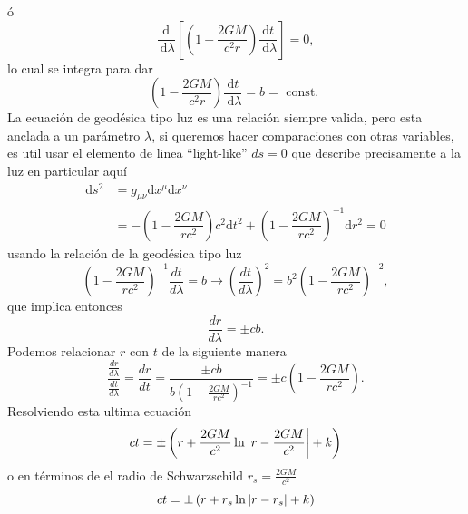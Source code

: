 ó
\begin{equation}
    \frac{\mathrm{d}}{\mathrm{~d} \lambda}\left[\left(1-\dfrac{2 G M}{c^2 r}\right) \frac{\mathrm{d} t}{\mathrm{~d} \lambda}\right]=0,
\end{equation}
lo cual se integra para dar
\begin{equation}
    \left(1-\dfrac{2 G M}{c^2 r}\right) \frac{\mathrm{d} t}{\mathrm{~d} \lambda}=b=\text { const. }
\end{equation}
La ecuación de geodésica tipo luz es una relación siempre valida, pero esta anclada a un parámetro $\lambda$, si queremos hacer comparaciones con otras variables, es util usar el elemento de linea ``light-like'' $ds = 0$ que describe precisamente a la luz  en particular aquí
\begin{equation}
    \begin{aligned}
        \mathrm{d} s^2 & =g_{\mu \nu} \mathrm{d} x^\mu \mathrm{d} x^\nu                                                                      \\
                       & =-\left(1-\dfrac{2 G M}{r c^2}\right)c^2 \mathrm{d} t^2+\left(1-\dfrac{2 G M}{r c^2}\right)^{-1} \mathrm{d} r^2 = 0
    \end{aligned}
\end{equation}
usando la relación de la geodésica tipo luz 
\begin{equation}
    \left(1-\frac{2 G M}{r c^2}\right)^{-1} \frac{dt}{d\lambda}  = b \rightarrow  \left(\frac{dt}{d\lambda}\right)^2 = b^2 \left(1-\frac{2 G M}{r c^2}\right)^{-2},
\end{equation}
que implica  entonces
\begin{equation}
    \frac{d r }{d \lambda}= \pm cb.
\end{equation}
Podemos relacionar $r$ con $t$  de la siguiente manera
\begin{equation}
    \frac{\frac{dr}{d\lambda}}{\frac{dt}{d\lambda}} =   \frac{dr}{dt} =  \frac{\pm cb }{ b \left(1-\frac{2 G M}{r c^2}\right)^{-1}} = \pm c \left(1-\frac{2 G M}{r c^2}\right).
\end{equation}
Resolviendo esta ultima ecuación
\begin{equation}
    ct = \pm \left(r + \frac{2 G M}{c^2} \ln \left| r -\frac{2 G M}{c^2}  \right| + k \right)
\end{equation}
o en términos de el radio de Schwarzschild $r_s = \frac{2 G M}{c^2}$
\begin{equation}
    ct = \pm \left(r + r_s \ln\left| r - r_s \right| + k \right)
    \label{eq:lightRaysSchwarzschild}
\end{equation}
